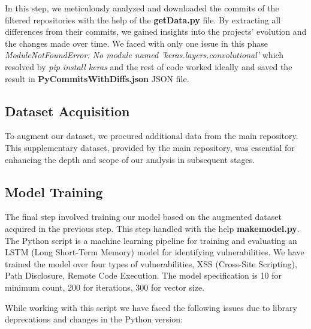 In this step, we meticulously analyzed and downloaded the commits of the filtered repositories with the help of the \textbf{getData.py} file. 
By extracting all differences from their commits, we gained insights into the projects' evolution and the changes made over time.
We faced with only one issue in this phase \textit{ModuleNotFoundError: No module named 'keras.layers.convolutional'} which resolved by \textit{pip install keras} and the rest of code worked ideally and saved the result in \textbf{PyCommitsWithDiffs.json} JSON file.

\subsection{Dataset Acquisition}

To augment our dataset, we procured additional data from the main repository. 
This supplementary dataset, provided by the main repository, was essential for enhancing the depth and scope of our analysis in subsequent stages.

\subsection{Model Training}

The final step involved training our model based on the augmented dataset acquired in the previous step. This step handled with the help \textbf{makemodel.py}.
The Python script is a machine learning pipeline for training and evaluating an LSTM (Long Short-Term Memory) model for identifying vulnerabilities. 
We have trained the model over four types of vulnerabilities, XSS (Cross-Site Scripting), Path Disclosure, Remote Code Execution. The model specification 
is 10 for minimum count, 200 for iterations, 300 for vector size.

While working with this script we have faced the following issues due to library deprecations and changes in the Python version:

